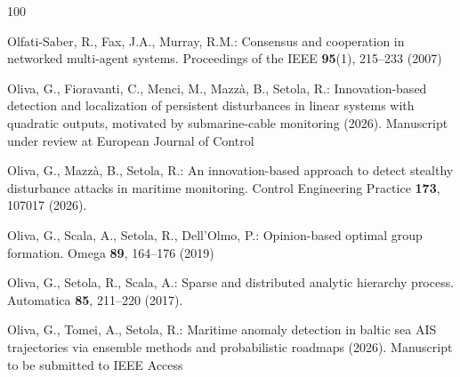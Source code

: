 \documentclass[graybox,envcountchap]{style/SNmono}
\begin{document}
\begin{thebibliography}{100}
{\color{red} 
Olfati-Saber, R., Fax, J.A., Murray, R.M.: Consensus and cooperation in
  networked multi-agent systems.
\newblock Proceedings of the IEEE \textbf{95}(1), 215--233 (2007)

\par}

Oliva, G., Fioravanti, C., Menci, M., Mazz{\`a}, B., Setola, R.:
  Innovation-based detection and localization of persistent disturbances in
  linear systems with quadratic outputs, motivated by submarine-cable
  monitoring (2026).
\newblock Manuscript under review at European Journal of Control



Oliva, G., Mazz{\`a}, B., Setola, R.: An innovation-based approach to detect
  stealthy disturbance attacks in maritime monitoring.
\newblock Control Engineering Practice \textbf{173}, 107017 (2026).
\newblock {}


{\color{red} 
Oliva, G., Scala, A., Setola, R., Dell'Olmo, P.: Opinion-based optimal group
  formation.
\newblock Omega \textbf{89}, 164--176 (2019)

\par}

Oliva, G., Setola, R., Scala, A.: Sparse and distributed analytic hierarchy
  process.
\newblock Automatica \textbf{85}, 211--220 (2017).
\newblock {}


{\color{red} 
Oliva, G., Tomei, A., Setola, R.: Maritime anomaly detection in baltic sea
  {AIS} trajectories via ensemble methods and probabilistic roadmaps (2026).
\newblock Manuscript to be submitted to {IEEE Access}

\par}
\end{thebibliography}
\end{document}
